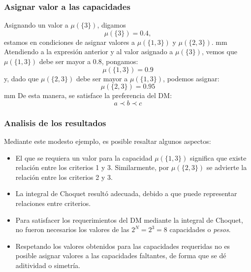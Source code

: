 \documentclass{beamer}
\theoremstyle{definition}
\begin{document}

       \begin{frame}
         \frametitle{Asignar valor a las capacidades}
         Asignando un valor a $\mu(\{3\})$, digamos
    $$
    \mu(\{3\}) = 0.4,
    $$
    estamos en condiciones de asignar valores a
    $\mu(\{1, 3\})$ y $\mu(\{2, 3\})$.
     mm
    Atendiendo a la expresión anterior y al valor asignado a $ \mu(\{3\})$, vemos que $\mu(\{1, 3\})$
    debe ser mayor a $0.8$, pongamos:
    $$
    \mu(\{1, 3\}) = 0.9
    $$
    y, dado que $\mu(\{2, 3\})$ debe ser mayor a $\mu(\{1, 3\})$, podemos asignar:
    $$
    \mu(\{2, 3\}) = 0.95
    $$
     mm De esta manera, se satisface la preferencia del DM:
    $$
    a \prec b \prec c
    $$
  \end{frame}

  \begin{frame}
  \frametitle{Analisis de los resultados}
  Mediante este modesto ejemplo, es posible resaltar algunos aspectos:
  \begin{itemize}
  \item El que se requiera un valor para la capacidad $\mu(\{1, 3\})$
    significa que existe relación entre los criterios 1 y
    3. Similarmente, por $\mu(\{2, 3\})$ se advierte la relación entre los
    criterios 2 y 3.
  \item La integral de Choquet resultó adecuada, debido a que puede
    representar relaciones entre criterios.
  \item Para satisfacer los requerimientos del DM mediante la integral
    de Choquet, no fueron necesarios los valores de las $2^N=2^3=8$
    capacidades o \emph{pesos}.
  \item Respetando los valores obtenidos para las capacidades
    requeridas no es posible asignar
    valores a las capacidades faltantes, de forma que se dé aditividad
    o simetría. 
  \end{itemize}
\end{frame}
\end{document}
